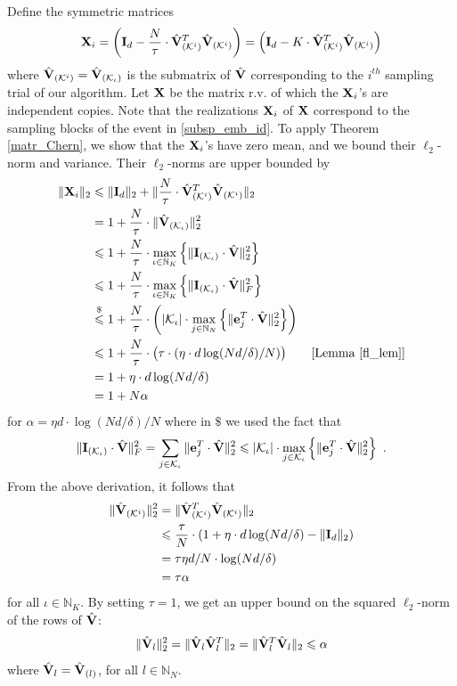 \documentclass[journal,letterpaper,onecolumn,twoside,nofonttune]{IEEEtran}
\newcommand{\K}{\mathcal{K}}
\newcommand{\Xb}{\bold{X}}
\newcommand{\N}{\mathbb{N}}
\newcommand{\eb}{\bold{e}}
\newcommand{\Ib}{\bold{I}}
\newcommand{\Vbh}{\hat{\bold{V}}}
\begin{document}
Define the symmetric matrices
\begin{equation}
\label{def_Xi}
  \Xb_i = \left(\Ib_d-\frac{N}{\tau}\cdot\Vbh_{(\K^i)}^T\Vbh_{(\K^i)}\right) = \left(\Ib_d-K\cdot \Vbh_{(\K^i)}^T\Vbh_{(\K^i)}\right)
\end{equation}
where $\Vbh_{(\K^i)}=\Vbh_{(\K_\iota)}$ is the submatrix of $\Vbh$ corresponding to the $i^{th}$ sampling trial of our algorithm. Let $\Xb$ be the matrix r.v. of which the $\Xb_i$'s are independent copies. Note that the realizations $\Xb_i$ of $\Xb$ correspond to the sampling blocks of the event in \eqref{subsp_emb_id}. To apply Theorem \ref{matr_Chern}, we show that the $\Xb_i$'s have zero mean, and we bound their $\ell_2$-norm and variance. Their $\ell_2$-norms are upper bounded by
\begin{align}
  \|\Xb_i\|_2 &\leqslant \|\Ib_d\|_2+\|\frac{N}{\tau}\cdot \Vbh_{(\K^i)}^T\Vbh_{(\K^i)}\|_2\notag\\
  &= 1+\frac{N}{\tau}\cdot\|\Vbh_{(\K_\iota)}\|_2^2\notag\\
  &\leqslant 1+\frac{N}{\tau}\cdot\max_{\iota\in\N_K}\left\{\|\Ib_{(\K_\iota)}\cdot\Vbh\|_2^2\right\}\notag\\
  &\leqslant 1+\frac{N}{\tau}\cdot\max_{\iota\in\N_K}\left\{\|\Ib_{(\K_\iota)}\cdot\Vbh\|_F^2\right\} \\
  &\overset{\$}{\leqslant} 1+\frac{N}{\tau}\cdot\left(|\K_\iota|\cdot\max_{j\in\N_N}\left\{\|\eb_j^T\cdot\Vbh\|_2^2\right\}\right)\notag\\
  &\leqslant 1+\frac{N}{\tau}\cdot\big(\tau\cdot(\eta \cdot d\log(Nd/\delta)/N)\big) \tag*{[Lemma \ref{fl_lem}]}\notag\\
  &= 1+\eta \cdot d\log(Nd/\delta) \label{bound_gamma}\\
  &=1+N\alpha\notag
\end{align}
for $\alpha=\eta d\cdot\log(Nd/\delta)/N$ where in $\$$ we used the fact that
$$ \|\Ib_{(\K_\iota)}\cdot\Vbh\|_F^2 = \sum_{j\in\K_\iota}\|\eb_j^T\cdot\Vbh\|_2^2 \leqslant |\K_\iota|\cdot\max_{j\in\K_\iota}\left\{\|\eb_j^T\cdot\Vbh\|_2^2\right\} \ . $$
From the above derivation, it follows that
\begin{align*}
  \|\Vbh_{(\K^i)}\|_2^2 &= \|\Vbh_{(\K^i)}^T\Vbh_{(\K^i)}\|_2 \\
  &\leqslant \frac{\tau}{N}\cdot\left(1+\eta \cdot d\log(Nd/\delta)-\|\Ib_d\|_2\right)\\
  &=\tau \eta d/N\cdot\log(Nd/\delta)\\
  &=\tau\alpha 
\end{align*}
for all $\iota\in\N_K$. By setting $\tau=1$, we get an upper bound on the squared $\ell_2$-norm of the rows of $\Vbh$:
\begin{equation}
\label{bound_out_prod_norm}
  \|\Vbh_l\|_2^2 =\|\Vbh_l\Vbh_l^T\|_2 =\|\Vbh_l^T\Vbh_l\|_2 \leqslant \alpha%
\end{equation}
where $\Vbh_l=\Vbh_{(l)}$, for all $l\in\N_N$.
\end{document}
